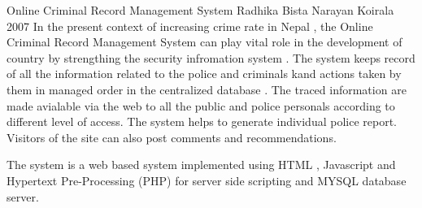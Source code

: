  \begin{conf-abstract}[]
{Online Criminal Record Management System }
{
Radhika Bista
Narayan Koirala
}
{ 2007 }
In the present context of increasing crime rate in Nepal , the Online Criminal Record Management System can play vital role in the development of country by strengthing the security infromation system . The system keeps record of all the information related to the police and criminals kand actions taken by them in managed order in the centralized database . The traced information are made avialable via the web to all the public and police personals according to different level of access. The system helps to generate individual police report. Visitors of the site can also post comments and recommendations.

The system is a web based system implemented using HTML , Javascript and Hypertext Pre-Processing (PHP) for server side scripting and MYSQL database server.
  \end{conf-abstract}